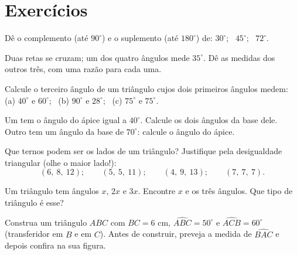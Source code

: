 \section{Exercícios}

\begin{exercise}[$\star$]\label{exo:g7:triangles:1}
Dê o complemento (até $90^\circ$) e o suplemento (até $180^\circ$) de:
$30^\circ$; \ $45^\circ$; \ $72^\circ$.
\end{exercise}

\begin{exercise}[$\star$]\label{exo:g7:triangles:2}
Duas retas se cruzam; um dos quatro ângulos mede $35^\circ$. Dê as
medidas dos outros três, com uma razão para cada uma.
\end{exercise}

\begin{exercise}[$\star$]\label{exo:g7:triangles:3}
Calcule o terceiro ângulo de um triângulo cujos dois primeiros ângulos
medem: (a) $40^\circ$ e $60^\circ$; \
(b) $90^\circ$ e $28^\circ$; \
(c) $75^\circ$ e $75^\circ$.
\end{exercise}

\begin{exercise}[$\star$]\label{exo:g7:triangles:4}
Um  tem o ângulo do ápice igual a $40^\circ$.
Calcule os dois ângulos da base dele. Outro  tem um
ângulo da base de $70^\circ$: calcule o ângulo do ápice.
\end{exercise}

\begin{exercise}[$\star$]\label{exo:g7:triangles:5}
Que ternos podem ser os lados de um triângulo? Justifique pela
desigualdade triangular (olhe o maior lado!):
\[
(6,\ 8,\ 12); \qquad
(5,\ 5,\ 11); \qquad
(4,\ 9,\ 13); \qquad
(7,\ 7,\ 7).
\]
\end{exercise}

\begin{exercise}[$\star$]\label{exo:g7:triangles:6}
Um triângulo tem ângulos $x$, $2x$ e $3x$. Encontre $x$ e os três
ângulos. Que tipo de triângulo é esse?
\end{exercise}

\begin{exercise}[$\star$]\label{exo:g7:triangles:7}
Construa um triângulo $ABC$ com $BC = 6$ cm,
$\widehat{ABC} = 50^\circ$ e $\widehat{ACB} = 60^\circ$ (transferidor
em $B$ e em $C$). Antes de construir, preveja a medida de
$\widehat{BAC}$ e depois confira na sua figura.
\end{exercise}

